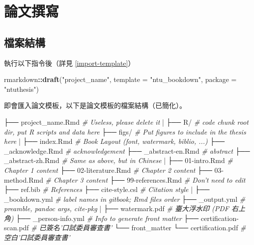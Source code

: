 \documentclass[oneside]{book}
\newenvironment{Shaded}{\begin{snugshade}}{\end{snugshade}}
\newcommand{\KeywordTok}[1]{\textcolor[rgb]{0.13,0.29,0.53}{\textbf{#1}}}
\newcommand{\DataTypeTok}[1]{\textcolor[rgb]{0.13,0.29,0.53}{#1}}
\newcommand{\StringTok}[1]{\textcolor[rgb]{0.31,0.60,0.02}{#1}}
\newcommand{\CommentTok}[1]{\textcolor[rgb]{0.56,0.35,0.01}{\textit{#1}}}
\newcommand{\OperatorTok}[1]{\textcolor[rgb]{0.81,0.36,0.00}{\textbf{#1}}}
\newcommand{\NormalTok}[1]{#1}
\theoremstyle{definition}
\theoremstyle{definition}
\theoremstyle{definition}
\theoremstyle{remark}
\begin{document}
\chapter{論文撰寫}\label{write-thesis}

\section{檔案結構}\label{dir-structure}

執行以下指令後（詳見 \ref{import-template}）

\begin{Shaded}
\begin{Highlighting}[]
\NormalTok{rmarkdown}\OperatorTok{::}\KeywordTok{draft}\NormalTok{(}\StringTok{"project_name"}\NormalTok{,}
                 \DataTypeTok{template =} \StringTok{"ntu_bookdown"}\NormalTok{,}
                 \DataTypeTok{package =} \StringTok{"ntuthesis"}\NormalTok{)}
\end{Highlighting}
\end{Shaded}

即會匯入論文模板，以下是論文模板的檔案結構（已簡化）。

\begin{Shaded}
\begin{Highlighting}[]
\NormalTok{├── project_name.Rmd     }\CommentTok{# Useless, please delete it}
\NormalTok{|}
\NormalTok{├── R/                   }\CommentTok{# code chunk root dir, put R scripts and data here}
\NormalTok{├── figs/                }\CommentTok{# Put figures to include in the thesis here}
\NormalTok{|}
\NormalTok{├── index.Rmd            }\CommentTok{# Book Layout (font, watermark, biblio, ...)}
\NormalTok{├── _acknowledge.Rmd     }\CommentTok{# acknowledgement}
\NormalTok{├── _abstract-en.Rmd     }\CommentTok{# abstract}
\NormalTok{├── _abstract-zh.Rmd     }\CommentTok{# Same as above, but in Chinese}
\NormalTok{|}
\NormalTok{├── 01-intro.Rmd         }\CommentTok{# Chapter 1 content}
\NormalTok{├── 02-literature.Rmd    }\CommentTok{# Chapter 2 content}
\NormalTok{├── 03-method.Rmd        }\CommentTok{# Chapter 3 content}
\NormalTok{├── 99-references.Rmd    }\CommentTok{# Don't need to edit}
\NormalTok{├── ref.bib              }\CommentTok{# References}
\NormalTok{├── cite-style.csl       }\CommentTok{# Citation style}
\NormalTok{|}
\NormalTok{├── _bookdown.yml        }\CommentTok{# label names in gitbook; Rmd files order}
\NormalTok{├── _output.yml          }\CommentTok{# preamble, pandoc args, cite-pkg}
\NormalTok{|}
\NormalTok{├── watermark.pdf        }\CommentTok{# 臺大浮水印 (PDF 右上角)}
\NormalTok{├── _person-info.yml      }\CommentTok{# Info to generate front matter}
\NormalTok{├── certification-scan.pdf  }\CommentTok{# 已簽名'口試委員審查書'}
\NormalTok{└── front_matter}
\NormalTok{    └── certification.pdf   }\CommentTok{# 空白'口試委員審查書'}
\end{Highlighting}
\end{Shaded}
\end{document}
